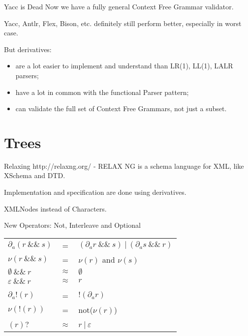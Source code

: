 \documentclass[10pt]{beamer}
\begin{document}

\begin{frame}{Yacc is Dead}
Now we have a fully general Context Free Grammar validator.

Yacc, Antlr, Flex, Bison, etc.  definitely still perform better, especially in worst case.

But derivatives:
\begin{itemize}
\item are a lot easier to implement and understand than LR(1), LL(1), LALR parsers;
\item have a lot in common with the functional Parser pattern;
\item can validate the full set of Context Free Grammars, not just a subset.
\end{itemize}
\end{frame}

\section{Trees}

\begin{frame}{Relaxing}
http://relaxng.org/ \cite{Relaxng2014} - RELAX NG is a schema language for XML, like XSchema and DTD.

Implementation and specification are done using derivatives.

XMLNodes instead of Characters.

New Operators: Not, Interleave and Optional

\begin{center}
\begin{tabular}{l c l}
$\partial_a (r\ \&\&\ s) $ & = & $(\partial_a r\ \&\&\ s)\ |\ (\partial_a s\ \&\&\ r)$ \\
$\nu(r\ \&\&\ s)$ & = & $\nu(r)$ and $\nu(s)$ \\
$\emptyset\ \&\&\ r$ & $\approx$ & $\emptyset$ \\
$\varepsilon\ \&\&\ r$ & $\approx$ & $r$ \\
\\
$\partial_a !(r) $ & = & $!(\partial_a r)$ \\
$\nu(!(r))$ & = & not($\nu(r)$)\\
\\
$(r)?$ & $\approx$ & $r\ |\ \varepsilon$ \\
\end{tabular}
\end{center}
\end{frame}
\end{document}
